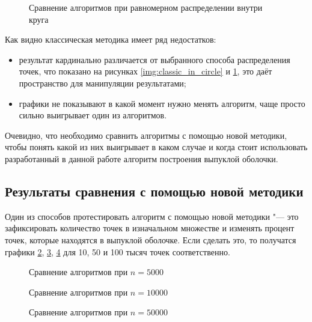 \begin{figure}[hbt]
	\centering
	
	\caption{Сравнение алгоритмов при равномерном распределении внутри круга}
	\label{img:classic_on_circle}
\end{figure}

Как видно классическая методика имеет ряд недостатков:
\begin{itemize}
	\item результат кардинально различается от выбранного способа распределения точек, что показано на рисунках \ref{img:classic_in_circle} и \ref{img:classic_on_circle}, это даёт пространство для манипуляции результатами;	
	\item графики не показывают в какой момент нужно менять алгоритм, чаще просто сильно выигрывает один из алгоритмов.
\end{itemize}

Очевидно, что необходимо сравнить алгоритмы с помощью новой методики, чтобы понять какой из них выигрывает в каком случае и когда стоит использовать разработанный в данной работе алгоритм построения выпуклой оболочки.

\subsection{Результаты сравнения с помощью новой методики}

Один из способов протестировать алгоритм с помощью новой методики "--- это зафиксировать количество точек в изначальном множестве и изменять процент точек, которые находятся в выпуклой оболочке. Если сделать это, то получатся графики \ref{img:comparison_5000}, \ref{img:comparison_10000}, \ref{img:comparison_50000} для 10, 50 и 100 тысяч точек соответственно.

\begin{figure}[hbt]
	\centering
	
	\caption{Сравнение алгоритмов при $n = 5000$}
	\label{img:comparison_5000}
\end{figure}

\begin{figure}
	\centering
	
	\caption{Сравнение алгоритмов при $n = 10000$}
	\label{img:comparison_10000}
\end{figure}

\begin{figure}
	\centering
	
	\caption{Сравнение алгоритмов при $n = 50000$}
	\label{img:comparison_50000}
\end{figure}

